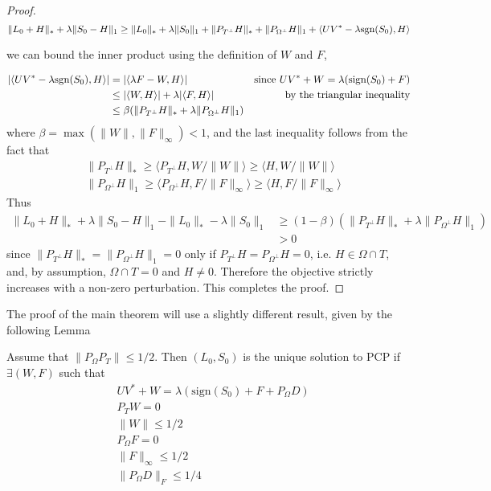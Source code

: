 \begin{proof}
\[
\|L_0 + H\|_* + \lambda \|S_0 - H\|_1 \geq \|L_0\|_* + \lambda \|S_0\|_1  + \|P_{T^\perp} H\|_* + \|P_{\Omega^\perp} H\|_1 + \langle UV^* - \lambda  \text{sgn}(S_0), H\rangle
\]

we can bound the inner product using the definition of $W$ and $F$,

\begin{align*}
|\langle UV^* - \lambda  \text{sgn}(S_0), H\rangle|
& = |\langle \lambda F - W, H\rangle|  & \text{since } UV^* + W = \lambda(\text{sign}(S_0) + F) \\
&\leq |\langle W, H \rangle| + \lambda |\langle F, H \rangle| & \text{by the triangular inequality} \\
&\leq \beta (\|P_{T^\perp} H\|_* + \lambda \|P_{\Omega^\perp} H\|_1)
\end{align*}
where $\beta = \max (\|W\|, \|F\|_\infty) < 1$, and the last inequality follows from the fact that
\[
\begin{aligned}
& \|P_{T^\perp} H\|_* \geq \langle P_{T^\perp} H, W/\|W\| \rangle \geq \langle H, W/\|W\| \rangle\\
& \|P_{\Omega^\perp} H\|_1 \geq \langle P_{\Omega^\perp} H, F/\|F\|_\infty \rangle \geq \langle H, F/\|F\|_\infty \rangle
\end{aligned}
\]
Thus
\begin{align*}
\|L_0 + H\|_* + \lambda \|S_0 - H\|_1 - \|L_0\|_* - \lambda \|S_0 \|_1
&\geq  (1-\beta) \left( \|P_{T^\perp} H\|_* + \lambda \|P_{\Omega^\perp} H\|_1 \right) \\
& > 0
\end{align*}
since $\|P_{T^\perp} H\|_* = \|P_{\Omega^\perp} H\|_1 = 0$ only if $P_{T^\perp} H = P_{\Omega^\perp} H = 0$, i.e. $H \in \Omega \cap T$, and, by assumption, $\Omega \cap T = {0}$ and $H \neq 0$. Therefore the objective strictly increases with a non-zero perturbation. This completes the proof.

\end{proof}


The proof of the main theorem will use a slightly different result, given by the following Lemma
\begin{lemma}
\label{lem:dual_cert}
Assume that $\|P_\Omega P_T \| \leq 1/2$. Then $(L_0,S_0)$ is the unique solution to PCP if $\exists (W, F)$ such that
\begin{equation}
\begin{aligned}
& UV^* + W = \lambda(\text{sign}(S_0) + F + P_\Omega D) \\
& P_T W = 0 \\
& \|W\| \leq 1/2 \\
& P_\Omega F = 0 \\
& \|F\|_\infty \leq 1/2 \\
&\|P_\Omega D \|_F \leq 1/4
\end{aligned}
\end{equation}

\end{lemma}

